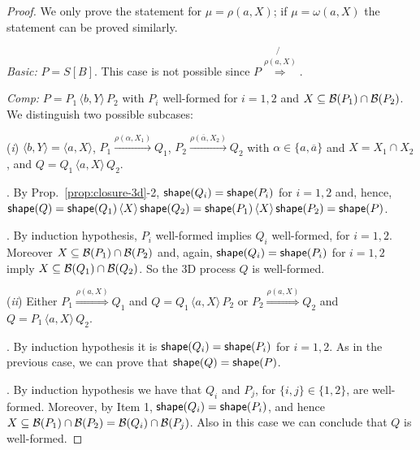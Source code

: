 \documentclass[11pt]{article}
\newcommand{\union}[1]{\ensuremath{\,\langle #1 \rangle\,}}
\newcommand{\unionc}[1]{\,\langle #1 \rangle\,}
\newcommand{\nar}[1]{\xrightarrow{#1}}
\newcommand{\dnar}[1]{\stackrel{#1}{\Rightarrow}}
\newcommand{\shape}{{\sf shape}}
\newcommand{\boundary}[1]{\ensuremath{{\cal B}(#1)}}
\begin{document}
\par\smallskip\noindent \begin{proof}
We only prove the statement for $\mu = \rho(a,X)$; if $\mu = \omega(a,X)$ the statement can be
proved similarly.

\par\medskip\noindent
{\em Basic:} $ P = S[B] $. This case is not possible since $P
\not{\dnar{\rho(a,X)}}$.
\par\medskip\noindent
{\em Comp:} $ P = P_1 \unionc{b,Y} P_2$ with $P_i$ well-formed for $i=1,2$ and $X \subseteq
\boundary{P_1} \cap \boundary{P_2}$. We distinguish two possible subcases:

\noindent ({\it i}) $\langle b, Y \rangle = \langle a, X \rangle$, $P_1 \nar{\rho(\alpha, X_1)}
Q_1$, $P_2 \nar{\rho(\overline{\alpha}, X_2)} Q_2$ with $\alpha \in \{a, \overline{a}\}$ and $X =
X_1 \cap X_2$, and $Q= Q_1 \unionc{a,X} Q_2$.

\par\medskip{}. By Prop.~\ref{prop:closure-3d}-2, $\shape(Q_i) = \shape(P_i)$ for $i=1,2$
and, hence, $\shape(Q) = \shape(Q_1) \union{X} \shape(Q_2) = \shape(P_1) \union{X} \shape(P_2)  =
\shape(P)$.

\par\smallskip{}. By induction hypothesis, $P_i$ well-formed implies $Q_i$ well-formed, for
$i=1,2$. Moreover $X 
\subseteq \boundary{P_1} \cap \boundary{P_2}$ and, again, $\shape(Q_i) = \shape(P_i)$ for $i=1,2$
imply $X \subseteq \boundary{Q_1} \cap \boundary{Q_2}$. So the 3D process $Q$ is well-formed.

\par\medskip\noindent ({\it ii}) Either $P_1 \dnar{\rho(a,X)} Q_1$ and $Q= Q_1
\unionc{a,X} P_2$ or $P_2 \dnar{\rho(a,X)} Q_2$ and
$Q= P_1 \unionc{a,X} Q_2$.

\par\medskip{}. By induction hypothesis it is $\shape(Q_i) = \shape(P_i)$ for $i=1,2$. As
in the previous case, we can prove that $\shape(Q) = \shape(P)$.

\par\smallskip{}. By induction hypothesis we have that $Q_i$ and  $P_j$, for $\{i,j\} \in
\{1,2\}$, are well-formed. Moreover, by Item 1, $\shape(Q_i)= \shape(P_i)$, and hence $X \subseteq
\boundary{P_1} \cap \boundary{P_2} = \boundary{Q_i} \cap \boundary{P_j}$. Also in this case we can
conclude that $Q$ is well-formed.
\end{proof}
\end{document}
